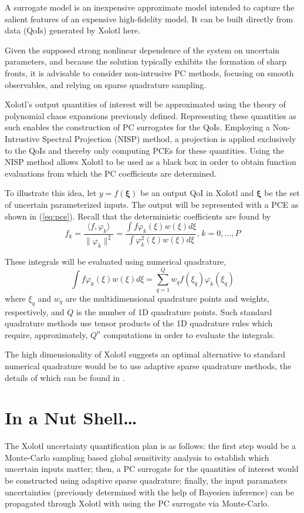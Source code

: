 \documentclass{article}
\begin{document}
A surrogate model is an inexpensive approximate model intended to capture the
salient features of an expensive high-fidelity model. It can be built
directly from data (QoIs) generated by Xolotl here. \newline

Given the supposed strong nonlinear dependence of the system on uncertain
parameters, and because the solution typically exhibits the formation of sharp fronts, it is
advisable to consider non-intrusive PC methods, focusing on smooth observables,
and relying on sparse quadrature sampling. \newline

Xolotl's output quantities of interest will be approximated using the theory of
polynomial chaos expansions previously defined.  Representing these quantities
as such enables the construction of PC surrogates for the QoIs. Employing a
Non-Intrustive Spectral Projection (NISP) method, a projection is applied
exclusively to the QoIs and thereby only computing PCEs for these quantities.
Using the NISP method allows Xolotl to be used as a black box in order to obtain
function evaluations from which the PC coefficients are determined. \newline

To illustrate this idea, let $y = f(\boldsymbol{\xi})$ be an output QoI in
Xolotl and $\boldsymbol{\xi}$ be the set of uncertain parameterized inputs.
The output will be represented with a PCE as shown in (\ref{eq:pce}). Recall
that the deterministic coefficients are found by
\[
f_k=\frac{\langle f,\varphi_k \rangle}{\| \varphi_k \|^2}
= \frac{\int f\varphi_k(\xi)w(\xi)d\xi}{\int \varphi_k^2(\xi)w(\xi)d\xi} \text{,
} \; k=0,\ldots,P
\]

These integrals will be evaluated using numerical quadrature,
\[
 \int f\varphi_k(\xi)w(\xi)d\xi=\sum_{q=1}^Q w_q f(\xi_q)\varphi_k(\xi_q)
\]
where $\xi_q$ and $w_q$ are the multidimensional quadrature points and
weights, respectively, and $Q$ is the number of 1D quadrature points. Such
standard quadrature methods use tensor products of the 1D quadrature rules which
require, approximately, $Q^n$ computations in order to evaluate the integrals. 
\newline

The high dimensionality of Xolotl suggests an optimal alternative to standard
numerical quadrature would be to use adaptive sparse quadrature methods, the
details of which can be found in \cite{spectral}.
      
\section{In a Nut Shell\dots}

The Xolotl uncertainty quantification plan is as follows: the first step would
be a Monte-Carlo sampling based global sensitivity analysis to establish which
uncertain inputs matter; then, a PC surrogate for the quantities of interest
would be constructed using adaptive sparse quadrature; finally, the
input paramaters uncertainties (previously determined with the help of
Bayesien inference) can be propagated through Xolotl with using the
PC surrogate via Monte-Carlo.



\end{document}
